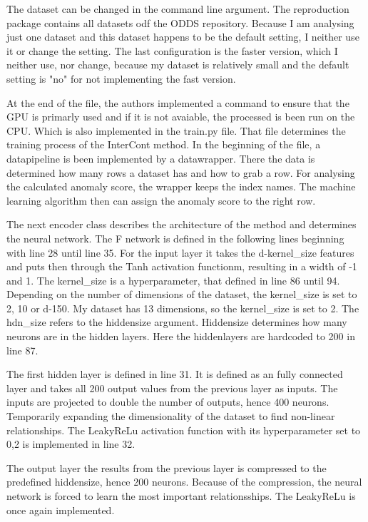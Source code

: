 The dataset can be changed in the command line argument.
The reproduction package contains all datasets odf the ODDS repository. 
Because I am analysing just one dataset and this dataset happens to be the default setting, I neither use it or change the setting.
The last configuration is the faster version, which I neither use, nor change, because my dataset is relatively small and the default setting is "no" for not implementing the fast version.
 

At the end of the file, the authors implemented a command to ensure that the GPU is primarly used and if it is not avaiable, the processed is been run on the CPU.
Which is also implemented in the train.py file. 
That file determines the training process of the InterCont method.
In the beginning of the file, a datapipeline is been implemented by a datawrapper. 
There the data is determined how many rows a dataset has and how to grab a row. 
For analysing the calculated anomaly score, the wrapper keeps the index names.
The machine learning algorithm then can assign the anomaly score to the right row.


The next encoder class describes the architecture of the method and determines the neural network.
The F network is defined in the following lines beginning with line 28 until line 35.
For the input layer it takes the d-kernel\_size features and puts then through the Tanh activation functionm, resulting in a width of -1 and 1.
The kernel\_size is a hyperparameter, that defined in line 86 until 94. 
Depending on the number of dimensions of the dataset, the kernel\_size is set to 2, 10 or d-150. 
My dataset has 13 dimensions, so the kernel\_size is set to 2.
The hdn\_size refers to the hiddensize argument.
Hiddensize determines how many neurons are in the hidden layers.
Here the hiddenlayers are hardcoded to 200 in line 87. 


The first hidden layer is defined in line 31.
It is defined as an fully connected layer and takes all 200 output values from the previous layer as inputs.
The inputs are projected to double the number of outputs, hence 400 neurons.
Temporarily expanding the dimensionality of the dataset to find non-linear relationships.
The LeakyReLu activation function with its hyperparameter set to 0,2 is implemented in line 32.


The output layer the results from the previous layer is compressed to the predefined hiddensize, hence 200 neurons. 
Because of the compression, the neural network is forced to learn the most important relationsships.
The LeakyReLu is once again implemented.


